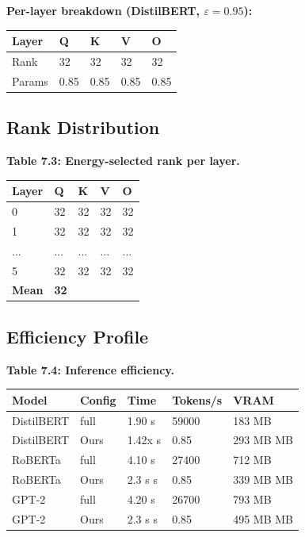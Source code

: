 \textbf{Per-layer breakdown (DistilBERT, $\varepsilon=0.95$):}

\begin{table}[H]
\centering
\small
\begin{tabular}{lllll}
\toprule
\textbf{Layer} & \textbf{Q} & \textbf{K} & \textbf{V} & \textbf{O} \\
\midrule
Rank & 32 & 32 & 32 & 32 \\
Params & 0.85 & 0.85 & 0.85 & 0.85 \\
\bottomrule
\end{tabular}
\end{table}

\subsection{Rank Distribution}

\textbf{Table 7.3: Energy-selected rank per layer.}

\begin{table}[H]
\centering
\small
\begin{tabular}{lllll}
\toprule
\textbf{Layer} & \textbf{Q} & \textbf{K} & \textbf{V} & \textbf{O} \\
\midrule
0 & 32 & 32 & 32 & 32 \\
1 & 32 & 32 & 32 & 32 \\
... & ... & ... & ... & ... \\
5 & 32 & 32 & 32 & 32 \\
\textbf{Mean} & \textbf{32} &  &  &  \\
\bottomrule
\end{tabular}
\end{table}

\subsection{Efficiency Profile}

\textbf{Table 7.4: Inference efficiency.}

\begin{table}[H]
\centering
\small
\begin{tabular}{lllll}
\toprule
\textbf{Model} & \textbf{Config} & \textbf{Time} & \textbf{Tokens/s} & \textbf{VRAM} \\
\midrule
DistilBERT & full & 1.90 s & 59000 & 183 MB \\
DistilBERT & Ours & 1.42x s & 0.85 & 293 MB MB \\
RoBERTa & full & 4.10 s & 27400 & 712 MB \\
RoBERTa & Ours & 2.3 s s & 0.85 & 339 MB MB \\
GPT-2 & full & 4.20 s & 26700 & 793 MB \\
GPT-2 & Ours & 2.3 s s & 0.85 & 495 MB MB \\
\bottomrule
\end{tabular}
\end{table}

